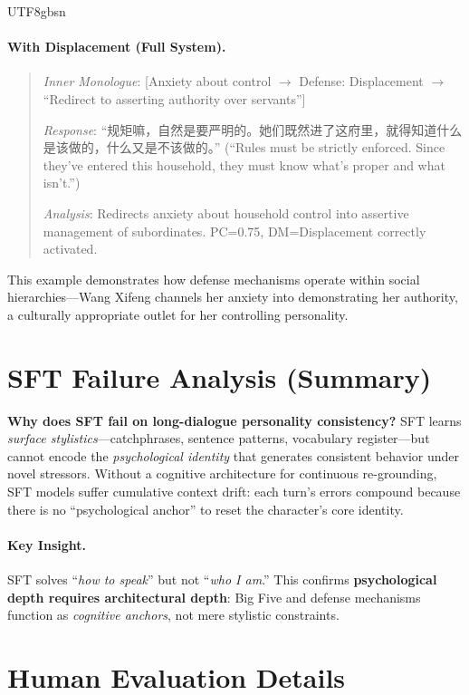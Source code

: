 \documentclass[11pt]{article}
\begin{document}
\begin{CJK*}{UTF8}{gbsn}
\paragraph{With Displacement (Full System).}
\begin{quote}
\textit{Inner Monologue}: [Anxiety about control $\rightarrow$ Defense: Displacement $\rightarrow$ ``Redirect to asserting authority over servants'']

\textit{Response}: ``规矩嘛，自然是要严明的。她们既然进了这府里，就得知道什么是该做的，什么又是不该做的。'' (``Rules must be strictly enforced. Since they've entered this household, they must know what's proper and what isn't.'')

\textit{Analysis}: Redirects anxiety about household control into assertive management of subordinates. PC=0.75, DM=Displacement correctly activated.
\end{quote}

This example demonstrates how defense mechanisms operate within social hierarchies---Wang Xifeng channels her anxiety into demonstrating her authority, a culturally appropriate outlet for her controlling personality.

\section{SFT Failure Analysis (Summary)}
\label{sec:sft_short_analysis}

\textbf{Why does SFT fail on long-dialogue personality consistency?} SFT learns \textit{surface stylistics}---catchphrases, sentence patterns, vocabulary register---but cannot encode the \textit{psychological identity} that generates consistent behavior under novel stressors. Without a cognitive architecture for continuous re-grounding, SFT models suffer cumulative context drift: each turn's errors compound because there is no ``psychological anchor'' to reset the character's core identity.

\paragraph{Key Insight.} SFT solves ``\textit{how to speak}'' but not ``\textit{who I am}.'' This confirms \textbf{psychological depth requires architectural depth}: Big Five and defense mechanisms function as \textit{cognitive anchors}, not mere stylistic constraints.

\section{Human Evaluation Details}
\label{sec:human_eval_details}


\end{CJK*}
\end{document}
